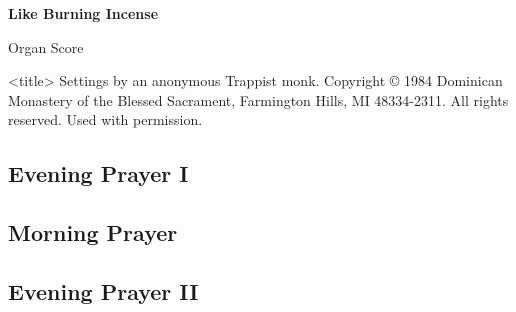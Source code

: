 \documentclass{lbi_cantor_bind}
\begin{document}
\thispagestyle{empty}

\begin{center}
    \null\vfill
    \Large\bfseries
    Like Burning Incense

    \normalfont\Large
    \vspace{2\baselineskip}Organ Score

    \vspace{1\baselineskip}<title>
    \vfill\vfill\vfill
    \small
    Settings by an anonymous Trappist monk. Copyright © 1984 Dominican Monastery of the Blessed Sacrament, Farmington Hills, MI 48334-2311. All rights reserved. Used with permission.
\end{center}

\newpage



\newpage\null\newpage

\subsection{Evening Prayer I}

\newpage
{}
\subsection{Morning Prayer}

\newpage
{}
\subsection{Evening Prayer II}

\newpage
\end{document}
